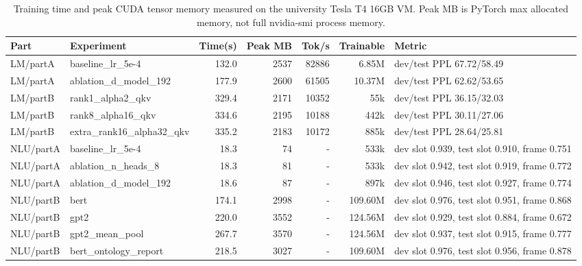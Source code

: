 \begin{table}[t]
\centering
\small
\begin{tabular}{llrrrrl}
\hline
Part & Experiment & Time(s) & Peak MB & Tok/s & Trainable & Metric \\
\hline
LM/partA & baseline\_lr\_5e-4 & 132.0 & 2537 & 82886 & 6.85M & dev/test PPL 67.72/58.49 \\
LM/partA & ablation\_d\_model\_192 & 177.9 & 2600 & 61505 & 10.37M & dev/test PPL 62.62/53.65 \\
LM/partB & rank1\_alpha2\_qkv & 329.4 & 2171 & 10352 & 55k & dev/test PPL 36.15/32.03 \\
LM/partB & rank8\_alpha16\_qkv & 334.6 & 2195 & 10188 & 442k & dev/test PPL 30.11/27.06 \\
LM/partB & extra\_rank16\_alpha32\_qkv & 335.2 & 2183 & 10172 & 885k & dev/test PPL 28.64/25.81 \\
NLU/partA & baseline\_lr\_5e-4 & 18.3 & 74 & - & 533k & dev slot 0.939, test slot 0.910, frame 0.751 \\
NLU/partA & ablation\_n\_heads\_8 & 18.3 & 81 & - & 533k & dev slot 0.942, test slot 0.919, frame 0.772 \\
NLU/partA & ablation\_d\_model\_192 & 18.6 & 87 & - & 897k & dev slot 0.946, test slot 0.927, frame 0.774 \\
NLU/partB & bert & 174.1 & 2998 & - & 109.60M & dev slot 0.976, test slot 0.951, frame 0.868 \\
NLU/partB & gpt2 & 220.0 & 3552 & - & 124.56M & dev slot 0.929, test slot 0.884, frame 0.672 \\
NLU/partB & gpt2\_mean\_pool & 267.7 & 3570 & - & 124.56M & dev slot 0.937, test slot 0.915, frame 0.777 \\
NLU/partB & bert\_ontology\_report & 218.5 & 3027 & - & 109.60M & dev slot 0.976, test slot 0.956, frame 0.878 \\
\hline
\end{tabular}
\caption{Training time and peak CUDA tensor memory measured on the university Tesla T4 16GB VM. Peak MB is PyTorch max allocated memory, not full nvidia-smi process memory.}
\label{tab:efficiency}
\end{table}
